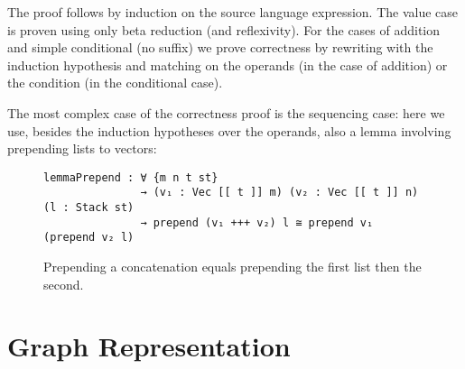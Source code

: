 \documentclass[a4paper]{article}
\begin{document}
        
        The proof follows by induction on the source language expression.
        The value case is proven using only beta reduction (and reflexivity).
        For the cases of addition and simple conditional (no suffix) we prove correctness
        by rewriting with the induction hypothesis and matching on the operands (in the case of addition) or the condition (in the conditional case).

        The most complex case of the correctness proof is the sequencing case:
        here we use, besides the induction hypotheses over the operands, also a lemma involving prepending lists to vectors:

        \begin{figure}[h!]
\begin{verbatim}
lemmaPrepend : ∀ {m n t st}
               → (v₁ : Vec [[ t ]] m) (v₂ : Vec [[ t ]] n) (l : Stack st)
               → prepend (v₁ +++ v₂) l ≅ prepend v₁ (prepend v₂ l)
\end{verbatim}
            \caption{Prepending a concatenation equals prepending the first list then the second.
                \label{lst:lemmaprepend}
            }
        \end{figure}



    \section{Graph Representation}
    \label{sec:lifting_introduction}


          

\end{document}
